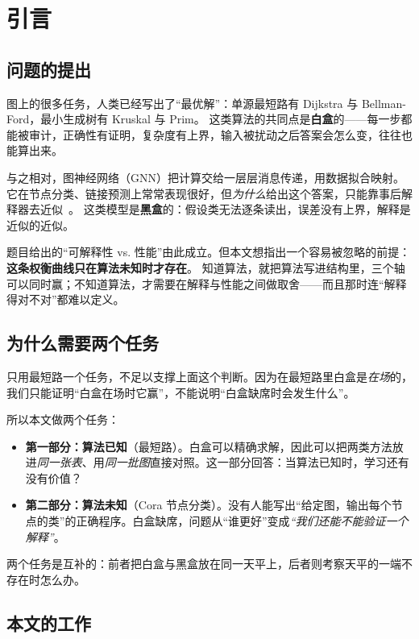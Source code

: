\section{引言}\label{sec:intro}

\subsection{问题的提出}

图上的很多任务，人类已经写出了“最优解”：单源最短路有 Dijkstra 与 Bellman-Ford，最小生成树有 Kruskal 与 Prim。
这类算法的共同点是\textbf{白盒}的——每一步都能被审计，正确性有证明，复杂度有上界，输入被扰动之后答案会怎么变，往往也能算出来。

与之相对，图神经网络（GNN）把计算交给一层层消息传递，用数据拟合映射。
它在节点分类、链接预测上常常表现很好，但\emph{为什么}给出这个答案，只能靠事后解释器去近似~\cite{ying2019gnnexplainer}。
这类模型是\textbf{黑盒}的：假设类无法逐条读出，误差没有上界，解释是近似的近似。

题目给出的“可解释性 vs. 性能”由此成立。但本文想指出一个容易被忽略的前提：\textbf{这条权衡曲线只在算法未知时才存在}。
知道算法，就把算法写进结构里，三个轴可以同时赢；不知道算法，才需要在解释与性能之间做取舍——而且那时连“解释得对不对”都难以定义。

\subsection{为什么需要两个任务}

只用最短路一个任务，不足以支撑上面这个判断。因为在最短路里白盒是\emph{在场}的，我们只能证明“白盒在场时它赢”，不能说明“白盒缺席时会发生什么”。

所以本文做两个任务：

\begin{itemize}[leftmargin=1.6em]
\item \textbf{第一部分：算法已知}（最短路）。白盒可以精确求解，因此可以把两类方法放进\emph{同一张表}、用\emph{同一批图}直接对照。这一部分回答：当算法已知时，学习还有没有价值？
\item \textbf{第二部分：算法未知}（Cora 节点分类）。没有人能写出“给定图，输出每个节点的类”的正确程序。白盒缺席，问题从“谁更好”变成\emph{“我们还能不能验证一个解释”}。
\end{itemize}

两个任务是互补的：前者把白盒与黑盒放在同一天平上，后者则考察天平的一端不存在时怎么办。

\subsection{本文的工作}

